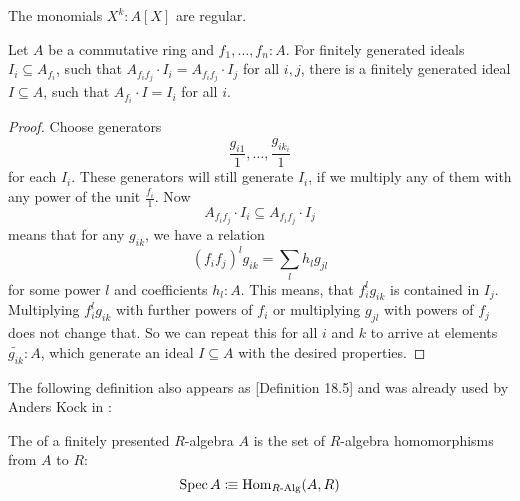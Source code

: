 \begin{example}
  The monomials $X^k:A[X]$ are regular.
\end{example}

\begin{lemma}%
  \label{fg-ideal-local-global}
  Let $A$ be a commutative ring and $f_1,\dots,f_n:A$.
  For finitely generated ideals $I_i\subseteq A_{f_i}$,
  such that $A_{f_if_j}\cdot I_i=A_{f_if_j}\cdot I_j$ for all $i,j$,
  there is a finitely generated ideal $I\subseteq A$,
  such that $A_{f_i}\cdot I=I_i$ for all $i$.
\end{lemma}

\begin{proof}
  Choose generators 
  \[ \frac{g_{i1}}{1},\dots,\frac{g_{ik_i}}{1} \]
  for each $I_i$.
  These generators will still generate $I_i$, if we multiply any of them with any power of the unit $\frac{f_i}{1}$.
  Now
  \[ A_{f_if_j}\cdot I_i\subseteq A_{f_if_j}\cdot I_j \]
  means that for any $g_{ik}$, we have a relation
  \[ (f_if_j)^l g_{ik}=\sum_{l}h_{l}g_{jl}\]
  for some power $l$ and coefficients $h_{l}:A$.
  This means, that $f_i^lg_{ik}$ is contained in $I_j$.
  Multiplying $f_i^lg_{ik}$ with further powers of $f_i$ or multiplying $g_{jl}$ with powers of $f_j$ does not change that.
  So we can repeat this for all $i$ and $k$ to arrive at elements $\tilde{g_{ik}}:A$,
  which generate an ideal $I\subseteq A$ with the desired properties.
\end{proof}

The following definition also appears as \cite{ingo-thesis}[Definition 18.5]
and was already used by Anders Kock in \cite{MISSING}:

\begin{definition}
  \label{spec}
  The  of a finitely presented $R$-algebra $A$
  is the set of $R$-algebra homomorphisms from $A$ to $R$:
  \[ \operatorname{Spec} A \vcentcolon\mspace{-1.2mu}\equiv \mathrm{Hom}_{R\text{-}\mathrm{Alg}}(A, R) \]
\end{definition}

